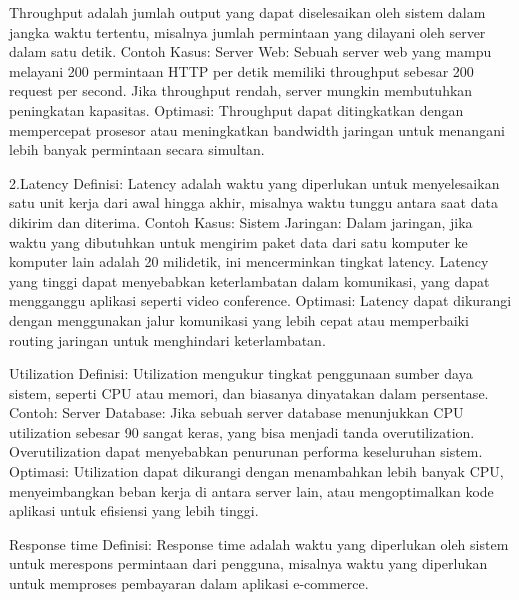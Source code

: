 \documentclass[12pt]{article}
\begin{document}
Throughput adalah jumlah output yang dapat diselesaikan oleh sistem dalam jangka waktu tertentu, misalnya jumlah permintaan yang dilayani oleh server dalam satu detik. Contoh Kasus: Server Web: Sebuah server web yang mampu melayani 200 permintaan HTTP per detik memiliki throughput sebesar 200 request per second. Jika throughput rendah, server mungkin membutuhkan peningkatan kapasitas. Optimasi: Throughput dapat ditingkatkan dengan mempercepat prosesor atau meningkatkan bandwidth jaringan untuk menangani lebih banyak permintaan secara simultan. 

 2.Latency
Definisi: Latency adalah waktu yang diperlukan untuk menyelesaikan satu unit kerja dari awal hingga akhir, misalnya waktu tunggu antara saat data dikirim dan diterima. Contoh Kasus: Sistem Jaringan: Dalam jaringan, jika waktu yang dibutuhkan untuk mengirim paket data dari satu komputer ke komputer lain adalah 20 milidetik, ini mencerminkan tingkat latency. Latency yang tinggi dapat menyebabkan keterlambatan dalam komunikasi, yang dapat mengganggu aplikasi seperti video conference. Optimasi: Latency dapat dikurangi dengan menggunakan jalur komunikasi yang lebih cepat atau memperbaiki routing jaringan untuk menghindari keterlambatan.

 Utilization
Definisi: Utilization mengukur tingkat penggunaan sumber daya
sistem, seperti CPU atau memori, dan biasanya dinyatakan
dalam persentase.
Contoh:
Server Database: Jika sebuah server database menunjukkan
CPU utilization sebesar 90%
sangat keras, yang bisa menjadi tanda overutilization.
Overutilization dapat menyebabkan penurunan performa
keseluruhan sistem.
Optimasi: Utilization dapat dikurangi dengan menambahkan lebih
banyak CPU, menyeimbangkan beban kerja di antara server
lain, atau mengoptimalkan kode aplikasi untuk efisiensi yang
lebih tinggi.

 Response time
Definisi: Response time adalah waktu yang diperlukan oleh sistem untuk merespons permintaan dari pengguna, misalnya waktu yang diperlukan untuk memproses pembayaran dalam aplikasi e-commerce.
\end{document}
